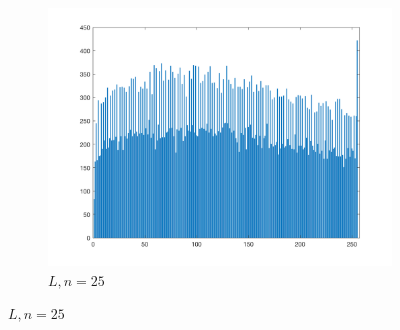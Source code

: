 \documentclass{article}
\begin{document}
\begin{enumerate}[label=(\alph*)]
\begin{figure}[!htb]
\begin{subfigure}[b]{0.3\textwidth}
            \includegraphics[width=\textwidth]{img/hist_L25.png}
            \caption{$L, n = 25$}
        \end{subfigure}
        
        

\end{figure}
\end{enumerate}
\end{document}
